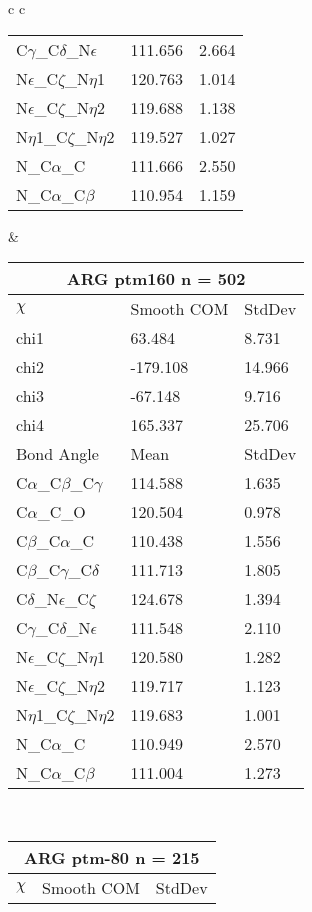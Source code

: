 \begin{longtable}{ c c }
\begin{tabular}{ l l l }
  C$\gamma$\_C$\delta$\_N$\epsilon$ & 111.656 & 2.664\\
  N$\epsilon$\_C$\zeta$\_N$\eta$1 & 120.763 & 1.014\\
  N$\epsilon$\_C$\zeta$\_N$\eta$2 & 119.688 & 1.138\\
  N$\eta$1\_C$\zeta$\_N$\eta$2 & 119.527 & 1.027\\
  N\_C$\alpha$\_C & 111.666 & 2.550\\
  N\_C$\alpha$\_C$\beta$ & 110.954 & 1.159\\
  \bottomrule
  \end{tabular}
  &
  \begin{tabular}{ l l l }
  \toprule
  \multicolumn{3}{c}{ARG \textbf{ptm160} n = 502} \\ \toprule
  $\chi$       & Smooth COM & StdDev \\ \midrule
  chi1 & 63.484 & 8.731 \\ 
  chi2 & -179.108 & 14.966 \\ 
  chi3 & -67.148 & 9.716 \\ 
  chi4 & 165.337 & 25.706 \\ \midrule
  Bond Angle   & Mean     & StdDev \\ \midrule
  C$\alpha$\_C$\beta$\_C$\gamma$ & 114.588 & 1.635\\
  C$\alpha$\_C\_O & 120.504 & 0.978\\
  C$\beta$\_C$\alpha$\_C & 110.438 & 1.556\\
  C$\beta$\_C$\gamma$\_C$\delta$ & 111.713 & 1.805\\
  C$\delta$\_N$\epsilon$\_C$\zeta$ & 124.678 & 1.394\\
  C$\gamma$\_C$\delta$\_N$\epsilon$ & 111.548 & 2.110\\
  N$\epsilon$\_C$\zeta$\_N$\eta$1 & 120.580 & 1.282\\
  N$\epsilon$\_C$\zeta$\_N$\eta$2 & 119.717 & 1.123\\
  N$\eta$1\_C$\zeta$\_N$\eta$2 & 119.683 & 1.001\\
  N\_C$\alpha$\_C & 110.949 & 2.570\\
  N\_C$\alpha$\_C$\beta$ & 111.004 & 1.273\\
  \bottomrule
  \end{tabular}
  \\
  \begin{tabular}{ l l l }
  \toprule
  \multicolumn{3}{c}{ARG \textbf{ptm-80} n = 215} \\ \toprule
  $\chi$       & Smooth COM & StdDev \\ \midrule

\end{tabular}
\end{longtable}
